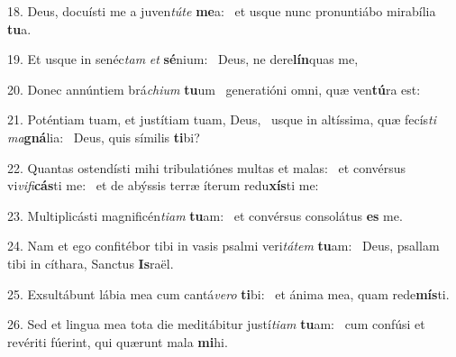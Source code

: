 18. Deus, docuísti me a juven\textit{tú}\textit{te} \textbf{me}a: \ast\  et usque nunc pronuntiábo mirabília \textbf{tu}a.\

19. Et usque in senéc\textit{tam} \textit{et} \textbf{sé}nium: \ast\  Deus, ne dere\textbf{lín}quas me,\

20. Donec annúntiem brá\textit{chi}\textit{um} \textbf{tu}um \ast\  generatióni omni, quæ ven\textbf{tú}ra est:\

21. Poténtiam tuam, et justítiam tuam, Deus, \dag\  usque in altíssima, quæ fecís\textit{ti} \textit{ma}\textbf{gná}lia: \ast\  Deus, quis símilis \textbf{ti}bi?\

22. Quantas ostendísti mihi tribulatiónes multas et malas: \dag\  et convérsus vi\textit{vi}\textit{fi}\textbf{cás}ti me: \ast\  et de abýssis terræ íterum redu\textbf{xís}ti me:\

23. Multiplicásti magnificén\textit{ti}\textit{am} \textbf{tu}am: \ast\  et convérsus consolátus \textbf{es} me.\

24. Nam et ego confitébor tibi in vasis psalmi veri\textit{tá}\textit{tem} \textbf{tu}am: \ast\  Deus, psallam tibi in cíthara, Sanctus \textbf{Is}raël.\

25. Exsultábunt lábia mea cum cantá\textit{ve}\textit{ro} \textbf{ti}bi: \ast\  et ánima mea, quam rede\textbf{mís}ti.\

26. Sed et lingua mea tota die meditábitur justí\textit{ti}\textit{am} \textbf{tu}am: \ast\  cum confúsi et revériti fúerint, qui quærunt mala \textbf{mi}hi.\

